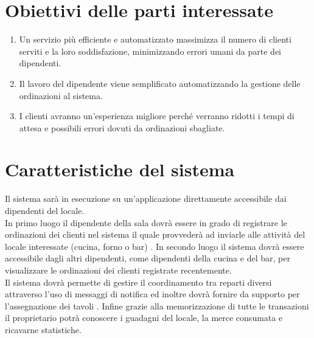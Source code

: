 \section{Obiettivi delle parti interessate}
\begin{enumerate}
    \item Un servizio più efficiente e automatizzato massimizza il numero di clienti serviti e la loro soddisfazione, minimizzando errori umani da parte dei dipendenti.
    \item Il lavoro del dipendente viene semplificato automatizzando la gestione delle ordinazioni al sistema.
    \item I clienti avranno un’esperienza migliore perché verranno ridotti i tempi di attesa e possibili errori dovuti da ordinazioni sbagliate. 
\end{enumerate}

\section{Caratteristiche del sistema}

Il sistema sarà in esecuzione su un’applicazione direttamente accessibile dai dipendenti del locale. \\
In primo luogo il dipendente della sala dovrà essere in grado di registrare le ordinazioni dei clienti nel sistema il quale provvederà ad inviarle alle attività del locale interessate (cucina, forno o bar) . In secondo luogo il sistema dovrà essere accessibile dagli altri dipendenti, come dipendenti della cucina e del bar, per visualizzare le ordinazioni dei clienti registrate recentemente. \\Il sistema dovrà permette di gestire il coordinamento tra reparti diversi attraverso l'uso di messaggi di notifica ed inoltre dovrà fornire da supporto per l’assegnazione dei tavoli .
Infine grazie alla memorizzazione di tutte le transazioni il proprietario potrà conoscere i guadagni del locale, la merce consumata e ricavarne statistiche.


